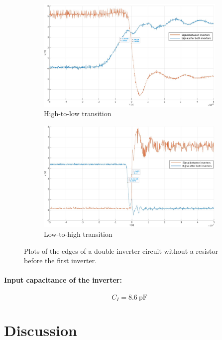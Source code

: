 \documentclass[onecolumn]{article}
\begin{document}
\begin{figure}[h!]
  \centering
  \begin{subfigure}{.5\textwidth}
    \centering
    \includegraphics[width=.8\linewidth]{task2bhl2.png}
    \caption{High-to-low transition}
    \label{fig:sub3}
  \end{subfigure}%
  \begin{subfigure}{.5\textwidth}
    \centering
    \includegraphics[width=.8\linewidth]{task2blh2.png}
    \caption{Low-to-high transition}
    \label{fig:sub4}
  \end{subfigure}
  \caption{Plots of the edges of a double inverter circuit without a resistor before the first inverter.}
  \label{fig:2}
\end{figure}

\paragraph{Input capacitance of the inverter:}
\begin{equation}
    C_{I} = 8.6 \ \text{pF}
\end{equation}


\section{Discussion}
\end{document}

